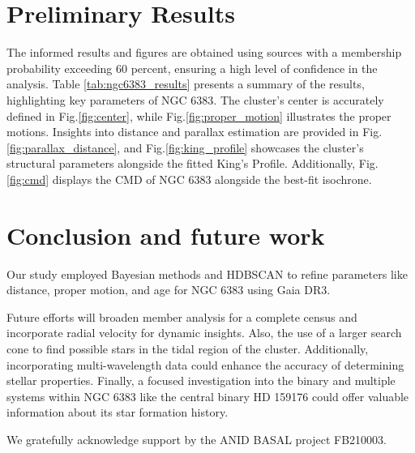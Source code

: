 \documentclass[baaa]{baaa}
\begin{document}
\section{Preliminary Results}

The informed results and figures are obtained using sources with a membership probability exceeding 60 percent, ensuring a high level of confidence in the analysis. Table \ref{tab:ngc6383_results} presents a summary of the results, highlighting key parameters of NGC 6383. The cluster's center is accurately defined in Fig.\ref{fig:center}, while Fig.\ref{fig:proper_motion} illustrates the proper motions. Insights into distance and parallax estimation are provided in Fig.\ref{fig:parallax_distance}, and Fig.\ref{fig:king_profile} showcases the cluster's structural parameters alongside the fitted King's Profile. Additionally, Fig.\ref{fig:cmd} displays the CMD of NGC 6383 alongside the best-fit isochrone.

\section{Conclusion and future work}

Our study employed Bayesian methods and \textsc{HDBSCAN} to refine parameters like distance, proper motion, and age for NGC 6383 using Gaia DR3. 

Future efforts will broaden member analysis for a complete census and incorporate radial velocity for dynamic insights. Also, the use of a larger search cone to find possible stars in the tidal region of the cluster.  Additionally, incorporating multi-wavelength data could enhance the accuracy of determining stellar properties. Finally, a focused investigation into the binary and multiple systems within NGC 6383 like the central binary HD 159176 could offer valuable information about its star formation history.

\begin{acknowledgement}
We gratefully acknowledge support by the ANID BASAL project FB210003.
\end{acknowledgement}



\small

 
\end{document}
